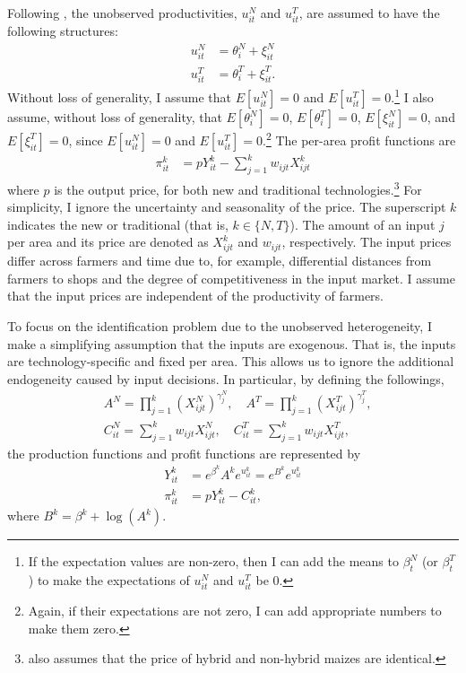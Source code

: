 \documentclass[11pt,letterpaper]{article}
\begin{document}
Following \citet{Suri11}, the unobserved productivities, $u_{it}^N$ and $u_{it}^T$, are assumed to have the following structures:
\begin{align*}
  u_{it}^N &= \theta_i^N + \xi_{it}^N \\
  u_{it}^T &= \theta_i^T + \xi_{it}^T.
\end{align*}
Without loss of generality, I assume that $E[u_{it}^N] = 0$ and $E[u_{it}^T] = 0$.\footnote{
  If the expectation values are non-zero, then I can add the means to $\beta_t^N$ (or $\beta_t^T$) to make the expectations of $u_{it}^N$ and $u_{it}^T$ be 0.
}
I also assume, without loss of generality, that $E[\theta_i^N] = 0$, $E[\theta_i^T] = 0$, $E[\xi_{it}^N] = 0$, and $E[\xi_{it}^T] = 0$, since $E[u_{it}^N] = 0$ and $E[u_{it}^T] = 0$.\footnote{
  Again, if their expectations are not zero, I can add appropriate numbers to make them zero.
}
The per-area profit functions are
\begin{align*}
  \pi_{it}^k &= p Y_{it}^k - \sum_{j=1}^k w_{ijt} X_{ijt}^k
\end{align*}
where $p$ is the output price, for both new and traditional technologies.\footnote{
  \citet{Suri11} also assumes that the price of hybrid and non-hybrid maizes are identical.
}
For simplicity, I ignore the uncertainty and seasonality of the price.
The superscript $k$ indicates the new or traditional (that is, $k \in \{N, T\}$).
The amount of an input $j$ per area and its price are denoted as $X_{ijt}^k$ and $w_{ijt}$, respectively.
The input prices differ across farmers and time due to, for example, differential distances from farmers to shops and the degree of competitiveness in the input market.
I assume that the input prices are independent of the productivity of farmers. 

To focus on the identification problem due to the unobserved heterogeneity, I make a simplifying assumption that the inputs are exogenous.
That is, the inputs are technology-specific and fixed per area.
This allows us to ignore the additional endogeneity caused by input decisions.
In particular, by defining the followings,
\begin{align*}
  &A^N = \prod_{j = 1}^k \left( X_{ijt}^N \right)^{\gamma_j^N}, \quad A^T = \prod_{j = 1}^k \left( X_{ijt}^T \right)^{\gamma_j^T}, \\
  &C_{it}^N = \sum_{j = 1}^k w_{ijt} X_{ijt}^N, \quad C_{it}^T = \sum_{j = 1}^k w_{ijt} X_{ijt}^T,
\end{align*}
the production functions and profit functions are represented by
\begin{align*}
  Y_{it}^k &= e^{\beta^k} A^k e^{u_{it}^k} = e^{B^k} e^{u_{it}^k} \\
  \pi_{it}^k &= p Y_{it}^k - C_{it}^k,
\end{align*}
where $B^k = \beta^k + \log(A^k)$.
\end{document}
